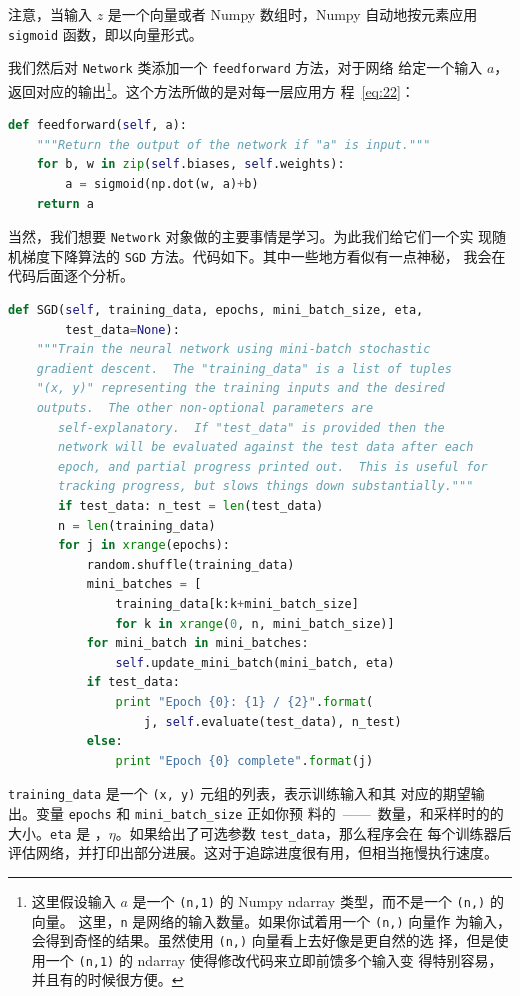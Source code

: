 注意，当输入 $z$ 是一个向量或者 Numpy 数组时，Numpy 自动地按元素应用
\lstinline!sigmoid! 函数，即以向量形式。

我们然后对 \lstinline!Network! 类添加一个 \lstinline!feedforward! 方法，对于网络
给定一个输入 $a$，返回对应的输出\footnote{这里假设输入 $a$ 是一个
  \lstinline!(n,1)! 的 Numpy ndarray 类型，而不是一个 \lstinline!(n,)! 的向量。
  这里，\lstinline!n! 是网络的输入数量。如果你试着用一个 \lstinline!(n,)! 向量作
  为输入，会得到奇怪的结果。虽然使用 \lstinline!(n,)! 向量看上去好像是更自然的选
  择，但是使用一个 \lstinline!(n,1)! 的 ndarray 使得修改代码来立即前馈多个输入变
  得特别容易，并且有的时候很方便。}。这个方法所做的是对每一层应用方
程~\eqref{eq:22}：
\begin{lstlisting}[language=Python]
def feedforward(self, a):
    """Return the output of the network if "a" is input."""
    for b, w in zip(self.biases, self.weights):
        a = sigmoid(np.dot(w, a)+b)
    return a
\end{lstlisting}

当然，我们想要 \lstinline!Network! 对象做的主要事情是学习。为此我们给它们一个实
现随机梯度下降算法的 \lstinline!SGD! 方法。代码如下。其中一些地方看似有一点神秘，
我会在代码后面逐个分析。
\begin{lstlisting}[language=Python]
def SGD(self, training_data, epochs, mini_batch_size, eta,
        test_data=None):
    """Train the neural network using mini-batch stochastic
    gradient descent.  The "training_data" is a list of tuples
    "(x, y)" representing the training inputs and the desired
    outputs.  The other non-optional parameters are
       self-explanatory.  If "test_data" is provided then the
       network will be evaluated against the test data after each
       epoch, and partial progress printed out.  This is useful for
       tracking progress, but slows things down substantially."""
       if test_data: n_test = len(test_data)
       n = len(training_data)
       for j in xrange(epochs):
           random.shuffle(training_data)
           mini_batches = [
               training_data[k:k+mini_batch_size]
               for k in xrange(0, n, mini_batch_size)]
           for mini_batch in mini_batches:
               self.update_mini_batch(mini_batch, eta)
           if test_data:
               print "Epoch {0}: {1} / {2}".format(
                   j, self.evaluate(test_data), n_test)
           else:
               print "Epoch {0} complete".format(j)
\end{lstlisting}

\lstinline!training_data! 是一个 \lstinline!(x, y)! 元组的列表，表示训练输入和其
对应的期望输出。变量 \lstinline!epochs! 和 \lstinline!mini_batch_size! 正如你预
料的~——~\epochs{}数量，和采样时的\minibatch{}的大小。\lstinline!eta! 是%
\learningrate{}，$\eta$。如果给出了可选参数 \lstinline!test_data!，那么程序会在
每个训练器后评估网络，并打印出部分进展。这对于追踪进度很有用，但相当拖慢执行速度。

